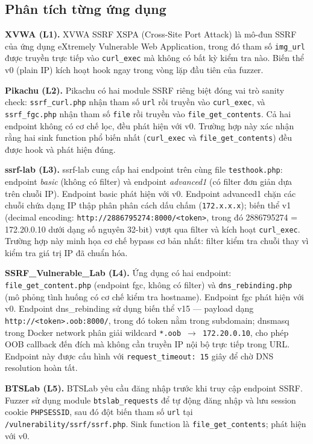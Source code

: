 \subsection{Phân tích từng ứng dụng}

\textbf{XVWA (L1).} XVWA SSRF XSPA (Cross-Site Port Attack) là mô-đun
SSRF của ứng dụng eXtremely Vulnerable Web Application, trong đó tham
số \texttt{img\_url} được truyền trực tiếp vào \texttt{curl\_exec} mà
không có bất kỳ kiểm tra nào. Biến thể v0 (plain IP) kích hoạt hook
ngay trong vòng lặp đầu tiên của fuzzer.

\textbf{Pikachu (L2).} Pikachu có hai module SSRF riêng biệt đóng vai
trò sanity check: \texttt{ssrf\_curl.php} nhận tham số \texttt{url} rồi
truyền vào \texttt{curl\_exec}, và \texttt{ssrf\_fgc.php} nhận tham số
\texttt{file} rồi truyền vào \texttt{file\_get\_contents}. Cả hai
endpoint không có cơ chế lọc, đều phát hiện với v0. Trường hợp này xác
nhận rằng hai sink function phổ biến nhất (\texttt{curl\_exec} và
\texttt{file\_get\_contents}) đều được hook và phát hiện đúng.

\textbf{ssrf-lab (L3).} ssrf-lab cung cấp hai endpoint trên cùng file
\texttt{testhook.php}: endpoint \textit{basic} (không có filter) và
endpoint \textit{advanced1} (có filter đơn giản dựa trên chuỗi IP).
Endpoint basic phát hiện với v0. Endpoint advanced1 chặn các chuỗi chứa
dạng IP thập phân phân cách dấu chấm (\texttt{172.x.x.x}); biến thể v1
(decimal encoding: \texttt{http://2886795274:8000/<token>}, trong đó
2886795274 = 172.20.0.10 dưới dạng số nguyên 32-bit) vượt qua filter và
kích hoạt \texttt{curl\_exec}. Trường hợp này minh họa cơ chế bypass
cơ bản nhất: filter kiểm tra chuỗi thay vì kiểm tra giá trị IP đã chuẩn
hóa.

\textbf{SSRF\_Vulnerable\_Lab (L4).} Ứng dụng có hai endpoint:
\texttt{file\_get\_content.php} (endpoint fgc, không có filter) và
\texttt{dns\_rebinding.php} (mô phỏng tình huống có cơ chế kiểm tra
hostname). Endpoint fgc phát hiện với v0. Endpoint dns\_rebinding sử
dụng biến thể v15 --- payload dạng \texttt{http://<token>.oob:8000/},
trong đó token nằm trong subdomain; dnsmasq trong Docker network phân
giải wildcard \texttt{*.oob $\rightarrow$ 172.20.0.10}, cho phép OOB
callback đến đích mà không cần truyền IP nội bộ trực tiếp trong URL.
Endpoint này được cấu hình với \texttt{request\_timeout: 15} giây để
chờ DNS resolution hoàn tất.

\textbf{BTSLab (L5).} BTSLab yêu cầu đăng nhập trước khi truy cập
endpoint SSRF. Fuzzer sử dụng module \texttt{btslab\_requests} để tự
động đăng nhập và lưu session cookie \texttt{PHPSESSID}, sau đó đột
biến tham số \texttt{url} tại \texttt{/vulnerability/ssrf/ssrf.php}.
Sink function là \texttt{file\_get\_contents}; phát hiện với v0.

